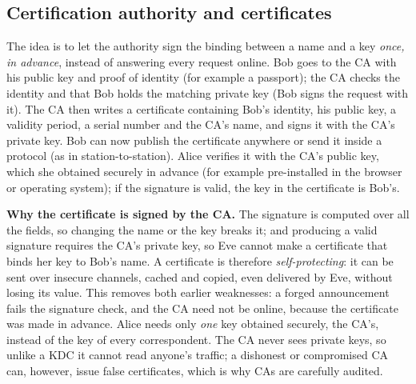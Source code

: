 \subsection{Certification authority and certificates \new}

The idea is to let the authority sign the binding between a name and a key \emph{once, in advance}, instead of answering every request online.  Bob goes to the CA with his public key and proof of identity (for example a passport); the CA checks the identity and that Bob holds the matching private key (Bob signs the request with it). The CA then writes a certificate containing Bob's identity, his public key, a validity period, a serial number and the CA's name, and signs it with the CA's private key. Bob can now publish the certificate anywhere or send it inside a protocol (as in station-to-station). Alice verifies it with the CA's public key, which she obtained securely in advance (for example pre-installed in the browser or operating system); if the signature is valid, the key in the certificate is Bob's.
\begin{center}
\end{center}
\textbf{Why the certificate is signed by the CA.} The signature is computed over all the fields, so changing the name or the key breaks it; and producing a valid signature requires the CA's private key, so Eve cannot make a certificate that binds her key to Bob's name. A certificate is therefore \emph{self-protecting}: it can be sent over insecure channels, cached and copied, even delivered by Eve, without losing its value. This removes both earlier weaknesses: a forged announcement fails the signature check, and the CA need not be online, because the certificate was made in advance. Alice needs only \emph{one} key obtained securely, the CA's, instead of the key of every correspondent. The CA never sees private keys, so unlike a KDC it cannot read anyone's traffic; a dishonest or compromised CA can, however, issue false certificates, which is why CAs are carefully audited.

